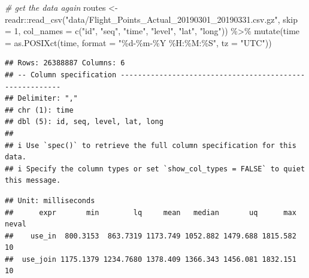 \documentclass[
]{book}
\newenvironment{Shaded}{\begin{snugshade}}{\end{snugshade}}
\newcommand{\AttributeTok}[1]{\textcolor[rgb]{0.77,0.63,0.00}{#1}}
\newcommand{\CommentTok}[1]{\textcolor[rgb]{0.56,0.35,0.01}{\textit{#1}}}
\newcommand{\DecValTok}[1]{\textcolor[rgb]{0.00,0.00,0.81}{#1}}
\newcommand{\FunctionTok}[1]{\textcolor[rgb]{0.00,0.00,0.00}{#1}}
\newcommand{\NormalTok}[1]{#1}
\newcommand{\OtherTok}[1]{\textcolor[rgb]{0.56,0.35,0.01}{#1}}
\newcommand{\SpecialCharTok}[1]{\textcolor[rgb]{0.00,0.00,0.00}{#1}}
\newcommand{\StringTok}[1]{\textcolor[rgb]{0.31,0.60,0.02}{#1}}
\begin{document}
\begin{Shaded}
\begin{Highlighting}[]
\CommentTok{\# get the data again }
\NormalTok{routes }\OtherTok{\textless{}{-}}\NormalTok{ readr}\SpecialCharTok{::}\FunctionTok{read\_csv}\NormalTok{(}\StringTok{"data/Flight\_Points\_Actual\_20190301\_20190331.csv.gz"}\NormalTok{, }\AttributeTok{skip =} \DecValTok{1}\NormalTok{,}
                          \AttributeTok{col\_names =} \FunctionTok{c}\NormalTok{(}\StringTok{"id"}\NormalTok{, }\StringTok{"seq"}\NormalTok{, }\StringTok{"time"}\NormalTok{, }\StringTok{"level"}\NormalTok{, }\StringTok{"lat"}\NormalTok{, }\StringTok{"long"}\NormalTok{)) }\SpecialCharTok{\%\textgreater{}\%} 
  \FunctionTok{mutate}\NormalTok{(}\AttributeTok{time =} \FunctionTok{as.POSIXct}\NormalTok{(time, }\AttributeTok{format =} \StringTok{"\%d{-}\%m{-}\%Y \%H:\%M:\%S"}\NormalTok{, }\AttributeTok{tz =} \StringTok{"UTC"}\NormalTok{))}
\end{Highlighting}
\end{Shaded}

\begin{verbatim}
## Rows: 26388887 Columns: 6
## -- Column specification --------------------------------------------------------
## Delimiter: ","
## chr (1): time
## dbl (5): id, seq, level, lat, long
## 
## i Use `spec()` to retrieve the full column specification for this data.
## i Specify the column types or set `show_col_types = FALSE` to quiet this message.
\end{verbatim}

\begin{Shaded}
\end{Shaded}

\begin{verbatim}
## Unit: milliseconds
##      expr       min        lq     mean   median       uq      max neval
##    use_in  800.3153  863.7319 1173.749 1052.882 1479.688 1815.582    10
##  use_join 1175.1379 1234.7680 1378.409 1366.343 1456.081 1832.151    10
\end{verbatim}
\end{document}
